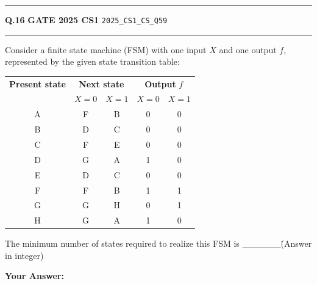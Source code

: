 \documentclass[a4paper,10pt]{article}
\begin{document}
\vspace{6pt}\hrule height 0.35pt\vspace{6pt}
\noindent
\begin{tcolorbox}[
    blanker,
    sidebyside,
    sidebyside align=top,
    lefthand width=0.55\textwidth,
    top=4pt, bottom=4pt, left=0pt, right=0pt,
    middle=16pt,
    underlay={
        \draw[dashed, black!80, line width=0.8pt, dash pattern=on 4pt off 3pt]
            ([xshift=0.55\textwidth+8pt]frame.north west) --
            ([xshift=0.55\textwidth+8pt]frame.south west);
    }
]
\textbf{Q.16}  \hfill {\footnotesize\textbf{GATE 2025 CS1} \quad \tiny\texttt{2025\_CS1\_CS\_Q59}}
\vspace{2pt}\hrule height 0.3pt\vspace{4pt}

Consider a finite state machine (FSM) with one input $X$ and one output $f$, represented by the given state transition table:
\par\medskip
\begin{tabular}{|c|cc|cc|}
\hline
\textbf{Present state} & \multicolumn{2}{c|}{\textbf{Next state}} & \multicolumn{2}{c|}{\textbf{Output } $f$} \\
& $X=0$ & $X=1$ & $X=0$ & $X=1$ \\
\hline
A & F & B & 0 & 0 \\
B & D & C & 0 & 0 \\
C & F & E & 0 & 0 \\
D & G & A & 1 & 0 \\
E & D & C & 0 & 0 \\
F & F & B & 1 & 1 \\
G & G & H & 0 & 1 \\
H & G & A & 1 & 0 \\
\hline
\end{tabular}
\par\medskip
The minimum number of states required to realize this FSM is \_\_\_\_\_\_\. (Answer in integer)

\par\vspace{6pt}\noindent\textbf{Your Answer:} \fbox{\rule{0pt}{1.3ex}\hspace{3cm}}

\tcblower


\end{tcolorbox}
\end{document}
